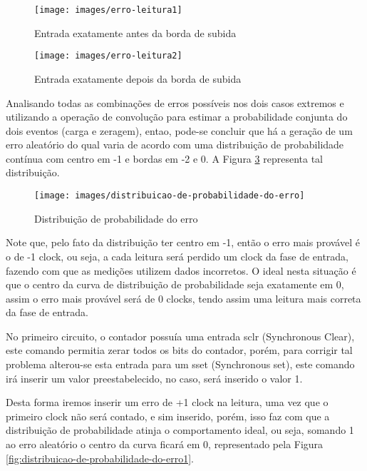 \begin{figure}[!htp]
	\centering
	\caption{Entrada exatamente antes da borda de subida}
	\texttt{[image: images/erro-leitura1]}
	\label{fig:erro-leitura1}
\end{figure}

\begin{figure}[!htp]
	\centering
	\caption{Entrada exatamente depois da borda de subida}
	\texttt{[image: images/erro-leitura2]}
	\label{fig:erro-leitura2}
\end{figure}

Analisando todas as combinações de erros possíveis nos dois casos extremos e utilizando a operação de convolução para estimar a probabilidade conjunta do dois eventos (carga e zeragem), entao, pode-se concluir que há a geração de um erro aleatório do qual varia de acordo com uma distribuição de probabilidade contínua com centro em -1 e bordas em -2 e 0. A Figura \ref{fig:distribuicao-de-probabilidade-do-erro} representa tal distribuição.

\begin{figure}[!htp]
	\centering
	\caption{Distribuição de probabilidade do erro}
	\texttt{[image: images/distribuicao-de-probabilidade-do-erro]}
	\label{fig:distribuicao-de-probabilidade-do-erro}
\end{figure}

Note que, pelo fato da distribuição ter centro em -1, então o erro mais provável é o de -1 clock, ou seja, a cada leitura será perdido um clock da fase de entrada, fazendo com que as medições utilizem dados incorretos. O ideal nesta situação é que o centro da curva de distribuição de probabilidade seja exatamente em 0, assim o erro mais provável será de 0 clocks, tendo assim uma leitura mais correta da fase de entrada.

No primeiro circuito, o contador possuía uma entrada sclr (Synchronous Clear), este comando permitia zerar todos os bits do contador, porém, para corrigir tal problema alterou-se esta entrada para um sset (Synchronous set), este comando irá inserir um valor preestabelecido, no caso, será inserido o valor 1.

Desta forma iremos inserir um erro de +1 clock na leitura, uma vez que o primeiro clock não será contado, e sim inserido, porém, isso faz com que a distribuição de probabilidade atinja o comportamento ideal, ou seja, somando 1 ao erro aleatório o centro da curva ficará em 0, representado pela Figura \ref{fig:distribuicao-de-probabilidade-do-erro1}.

